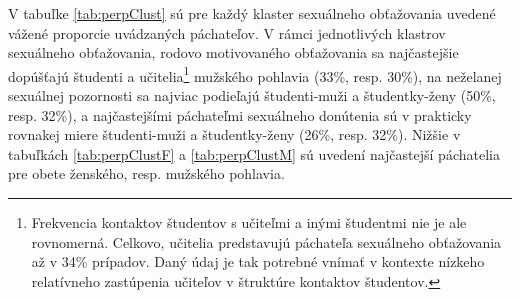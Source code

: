 \documentclass[
]{article}
\begin{document}
\begin{table}[H]

\caption{\label{tab:perpClust}Najčastejší páchatelia celkovo - klastre}
\centering
{}
\end{table}

V tabuľke \ref{tab:perpClust} sú pre každý klaster sexuálneho obťažovania uvedené vážené proporcie uvádzaných páchateľov. V rámci jednotlivých klastrov sexuálneho obťažovania, rodovo motivovaného obťažovania sa najčastejšie dopúšťajú študenti a učitelia\footnote{Frekvencia kontaktov študentov s učiteľmi a inými študentmi nie je ale rovnomerná. Celkovo, učitelia predstavujú páchateľa sexuálneho obťažovania až v 34\% prípadov. Daný údaj je tak potrebné vnímať v kontexte nízkeho relatívneho zastúpenia učiteľov v štruktúre kontaktov študentov.} mužského pohlavia (33\%, resp. 30\%), na neželanej sexuálnej pozornosti sa najviac podieľajú študenti-muži a študentky-ženy (50\%, resp. 32\%), a najčastejšími páchateľmi sexuálneho donútenia sú v prakticky rovnakej miere študenti-muži a študentky-ženy (26\%, resp. 32\%). Nižšie v tabuľkách \ref{tab:perpClustF} a \ref{tab:perpClustM} sú uvedení najčastejší páchatelia pre obete ženského, resp. mužského pohlavia.
\end{document}
